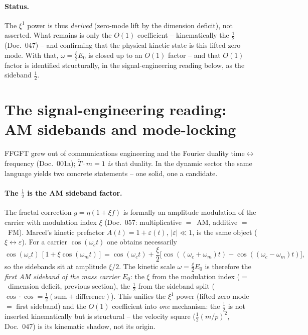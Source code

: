 \paragraph{Status.} The $\xi^1$ power is thus \emph{derived} (zero-mode lift by the dimension deficit),
not asserted. What remains is only the $O(1)$ coefficient -- kinematically the $\tfrac12$ (Doc.~047) --
and confirming that the physical kinetic state is this lifted zero mode. With that, $\omega=\tfrac{\xi}{2}E_0$
is closed up to an $O(1)$ factor -- and that $O(1)$ factor is identified structurally, in the
signal-engineering reading below, as the sideband $\tfrac12$.

\section{The signal-engineering reading: AM sidebands and mode-locking}
FFGFT grew out of communications engineering and the Fourier duality time$\leftrightarrow$frequency
(Doc.~001a); $\tilde T\!\cdot\! m=1$ \emph{is} that duality. In the dynamic sector the same language
yields two concrete statements -- one solid, one a candidate.

\paragraph{The $\tfrac12$ is the AM sideband factor.} The fractal correction $g=\eta(1+\xi f)$ is
formally an amplitude modulation of the carrier with modulation index $\xi$ (Doc.~057: multiplicative
$=$~AM, additive $=$~FM). Marcel's kinetic prefactor $A(t)=1+\varepsilon(t)$, $|\varepsilon|\ll1$, is
the same object ($\xi\leftrightarrow\varepsilon$). For a carrier $\cos(\omega_c t)$ one obtains
necessarily
\begin{equation}
\cos(\omega_c t)\,[1+\xi\cos(\omega_m t)]
=\cos(\omega_c t)+\frac{\xi}{2}\big[\cos((\omega_c{+}\omega_m)t)+\cos((\omega_c{-}\omega_m)t)\big],
\end{equation}
so the sidebands sit at amplitude $\xi/2$. The kinetic scale $\omega=\tfrac{\xi}{2}E_0$ is therefore the
\emph{first AM sideband of the mass carrier $E_0$}: the $\xi$ from the modulation index ($=$~dimension
deficit, previous section), the $\tfrac12$ from the sideband split
($\cos\!\cdot\!\cos=\tfrac12(\text{sum}+\text{difference})$). This unifies the $\xi^1$ power (lifted zero
mode $=$ first sideband) and the $O(1)$ coefficient into \emph{one} mechanism: the $\tfrac12$ is not
inserted kinematically but is structural -- the velocity square ($\tfrac12(m/p)^2$, Doc.~047) is its
kinematic shadow, not its origin.

